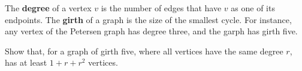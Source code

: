 \documentclass[kulak]{tplt}
\theoremstyle{definition}
\begin{document}
\begin{enumerate}
The \textbf{degree} of a vertex $v$ is the number of edges that have $v$ as one of its endpoints.
The \textbf{girth} of a graph is the size of the smallest cycle.
For instance, any vertex of the Petersen graph has degree three, and the garph has girth five.

Show that, for a graph of girth five, where all vertices have the same degree $r$, has at least $1+r+r^2$ vertices.

\end{enumerate}
\end{document}

